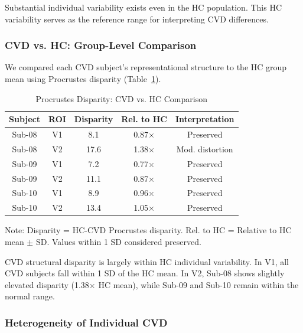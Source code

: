 \documentclass[12pt,a4paper]{article}
\begin{document}
Substantial individual variability exists even in the HC population. This HC variability serves as the reference range for interpreting CVD differences.

\subsubsection{CVD vs. HC: Group-Level Comparison}

We compared each CVD subject's representational structure to the HC group mean using Procrustes disparity (Table~\ref{tab:procrustes}).

\begin{table}[ht]
\centering
\caption{Procrustes Disparity: CVD vs. HC Comparison\label{tab:procrustes}}
\small
\begin{threeparttable}
\begin{tabular}{ccccc}
\toprule
Subject & ROI & Disparity & Rel. to HC & Interpretation \\
\midrule
Sub-08 & V1 & 8.1 & 0.87$\times$ & Preserved \\
Sub-08 & V2 & 17.6 & 1.38$\times$ & Mod. distortion \\
Sub-09 & V1 & 7.2 & 0.77$\times$ & Preserved \\
Sub-09 & V2 & 11.1 & 0.87$\times$ & Preserved \\
Sub-10 & V1 & 8.9 & 0.96$\times$ & Preserved \\
Sub-10 & V2 & 13.4 & 1.05$\times$ & Preserved \\
\bottomrule
\end{tabular}
\begin{tablenotes}
\small
\item Note: Disparity = HC-CVD Procrustes disparity. Rel. to HC = Relative to HC mean $\pm$ SD. Values within 1 SD considered preserved.
\end{tablenotes}
\end{threeparttable}
\end{table}

CVD structural disparity is largely within HC individual variability. In V1, all CVD subjects fall within 1 SD of the HC mean. In V2, Sub-08 shows slightly elevated disparity (1.38$\times$ HC mean), while Sub-09 and Sub-10 remain within the normal range.

\subsubsection{Heterogeneity of Individual CVD}
\end{document}
